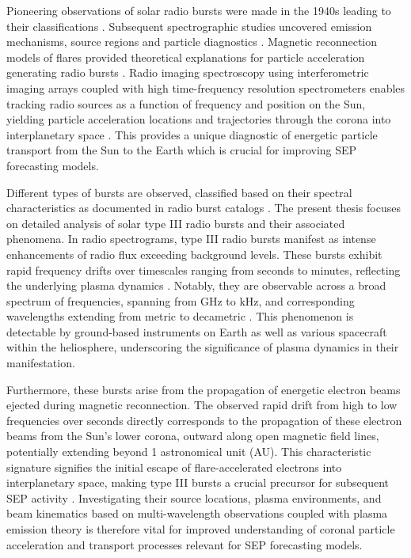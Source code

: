 Pioneering observations of solar radio bursts were made in the 1940s leading to their classifications \citep{wild_1963}. Subsequent spectrographic studies uncovered emission mechanisms, source regions and particle diagnostics \citep{suzuki_1985}. Magnetic reconnection models of flares provided theoretical explanations for particle acceleration generating radio bursts \citep{holman_2011}. Radio imaging spectroscopy using interferometric imaging arrays coupled with high time-frequency resolution spectrometers enables tracking radio sources as a function of frequency and position on the Sun, yielding particle acceleration locations and trajectories through the corona into interplanetary space \citep{krucker_2011, klassen_2003a, klassen_2003b}. This provides a unique diagnostic of energetic particle transport from the Sun to the Earth which is crucial for improving SEP forecasting models.

Different types of bursts are observed, classified based on their spectral characteristics as documented in radio burst catalogs \citep{wild_1963}. The present thesis focuses on detailed analysis of solar type III radio bursts and their associated phenomena.
In radio spectrograms, type III radio bursts manifest as intense enhancements of radio flux exceeding background levels. These bursts exhibit rapid frequency drifts over timescales ranging from seconds to minutes, reflecting the underlying plasma dynamics \citep{reid_2017}. Notably, they are observable across a broad spectrum of frequencies, spanning from GHz to kHz, and corresponding wavelengths extending from metric to decametric \citep{wild_1950a, lecacheux_1989, bonnin_2008}. This phenomenon is detectable by ground-based instruments on Earth as well as various spacecraft within the heliosphere, underscoring the significance of plasma dynamics in their manifestation.

Furthermore, these bursts arise from the propagation of energetic electron beams ejected during magnetic reconnection. The observed rapid drift from high to low frequencies over seconds directly corresponds to the propagation of these electron beams from the Sun's lower corona, outward along open magnetic field lines, potentially extending beyond 1 astronomical unit (AU). This characteristic signature signifies the initial escape of flare-accelerated electrons into interplanetary space, making type III bursts a crucial precursor for subsequent SEP activity \citep{cane_2002, macdowall_2003}.
Investigating their source locations, plasma environments, and beam kinematics based on multi-wavelength observations coupled with plasma emission theory is therefore vital for improved understanding of coronal particle acceleration and transport processes relevant for SEP forecasting models.

